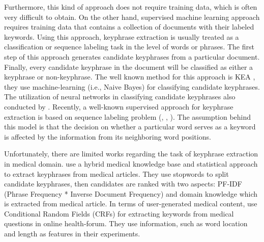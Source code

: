 Furthermore, this kind of approach does not require training data, which is often very difficult to obtain. On the other hand, supervised machine learning approach requires training data that contains a collection of documents with their labeled keywords. Using this approach, keyphrase extraction is usually treated as a classification or sequence labeling task in the level of words or phrases. The first step of this approach generates candidate keyphrases from a particular document. Finally, every candidate keyphrase in the document will be classified as either a keyphrase or non-keyphrase. The well known method for this approach is KEA \cite{witten1999kea}, they use machine-learning (i.e., Naive Bayes) for classifying candidate keyphrases. The utilization of neural networks in classifying candidate keyphrases also conducted by \cite{ekpNeuralNetworks}. Recently, a well-known supervised approach for keyphrase extraction is based on sequence labeling problem (\cite{zhang2008automatic}, \cite{cao2010automatically}, \cite{zhang2016keyphrase}). The assumption behind this model is that the decision on whether a particular word serves as a keyword is affected by the information from its neighboring word positions.

Unfortunately, there are limited works regarding the task of keyphrase extraction in medical domain. \cite{ekpMedicalDocumentHybrid} use a hybrid medical knowledge base and statistical approach to extract keyphrases from medical articles. They use stopwords to split candidate keyphrases, then candidates are ranked with two aspects: PF-IDF (Phrase Frequency * Inverse Document Frequency) and domain knowledge which is extracted from medical article. In terms of user-generated medical content, \cite{cao2010automatically} use Conditional Random Fields (CRFs) for extracting keywords from medical questions in online health-forum. They use information, such as word location and length as features in their experiments.

